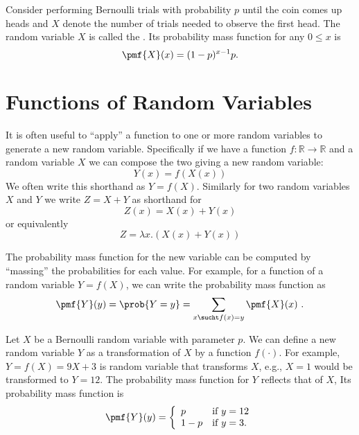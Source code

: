 \begin{gram}
Consider performing Bernoulli trials with probability $p$ until the
coin comes up heads and  $X$ denote the number of trials needed to
observe the first head. 
%
The random variable $X$ is called the .
%
Its probability mass function for any $0 \le x$ is 
%
\[
\pmf{X}(x) = (1-p)^{x-1} p.
\]
\end{gram}

\section{Functions of Random Variables}
\label{sec:probability::randvar::functionsof}

\begin{flex}
  \begin{gram}
    It is often useful to ``apply'' a function to one or more random
    variables to generate a new random variable.   Specifically if we
    have a
    function $f : \mathbb{R} \rightarrow \mathbb{R}$ and
    a random variable $X$ we can compose the two giving a new
    random variable:
    \[Y(x) = f(X(x)) \]
    We often write this shorthand as $Y = f(X)$.
    Similarly for two random variables $X$ and $Y$
    we write $Z = X + Y$ as shorthand for 
        \[Z(x) = X(x) + Y(x) \]
    or equivalently
        \[Z = \lambda x . (X(x) + Y(x)) \]

%
The probability mass function for the new variable can be computed by
``massing'' the probabilities for each value.
%
For example, for a function of a random variable $Y = f(X)$, we can
write the probability mass function as 
\[
\pmf{Y}(y) = \prob{Y = y} = \sum_{x \sucht f(x) = y}{\pmf{X}(x)}~.
\]
%
\end{gram}

\begin{example}
Let $X$ be a Bernoulli random variable with parameter $p$.  We can
define a new random variable $Y$ as a transformation of $X$ by a
function $f(\cdot)$.  For example, $Y = f(X) = 9X + 3$ is random
variable that transforms $X$, e.g., $X = 1$ would be transformed to $Y
= 12$.
%
The probability mass function for $Y$ reflects that of $X$,
%
Its probability mass function is 
\[
\pmf{Y}(y) = 
\left\{
\begin{array}{ll}
p & \mbox{if}~y = 12
\\
1-p & \mbox{if}~y = 3.
\end{array}
\right.
\]


\end{example}
\end{flex}
